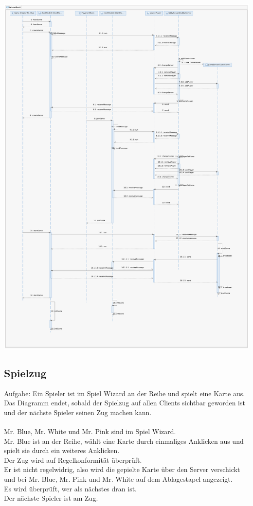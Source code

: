 \documentclass{article}
\begin{document}
\includegraphics[width=\textwidth]{Entwurf_CreateGame}

\subsection{Spielzug}
		Aufgabe: Ein Spieler ist im Spiel Wizard an der Reihe und spielt eine Karte aus.
		Das Diagramm endet, sobald der Spielzug auf allen Clients sichtbar
		geworden ist und der nächste Spieler seinen Zug machen kann.\\
		\ \\
		Mr. Blue, Mr. White und Mr. Pink sind im Spiel Wizard. \\
		Mr. Blue ist an der Reihe, wählt eine Karte durch einmaliges Anklicken aus und spielt sie durch ein weiteres Anklicken.\\
		Der Zug wird auf Regelkonformität überprüft.\\
		Er ist nicht regelwidrig, also wird die gepielte Karte über den Server verschickt und bei Mr. Blue, Mr. Pink und Mr. White auf dem Ablagestapel angezeigt. \\
		Es wird überprüft, wer als nächstes dran ist.\\
		Der nächste Spieler ist am Zug. \\
\end{document}
